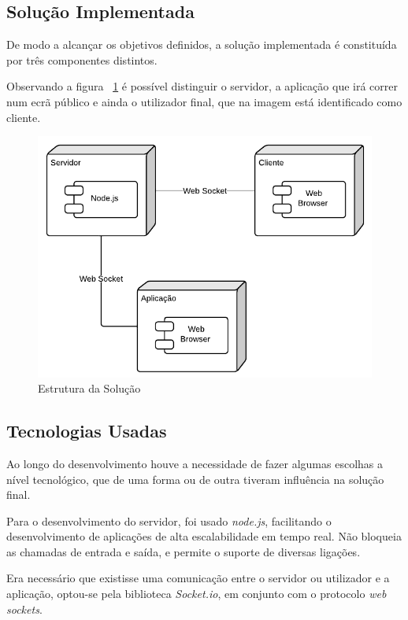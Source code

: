 \documentclass[9pt,a4paper]{extarticle}
\begin{document}
\begin{multicols}{2}
\section{Solução Implementada}\label{sec:work}

De modo a alcançar os objetivos definidos, a solução implementada é constituída por três componentes distintos. 

Observando a figura ~\ref{fig:componentes} é possível distinguir o servidor, a aplicação que irá correr num ecrã público e ainda o utilizador final, que na imagem está identificado como cliente.

\begin{figure}[H]
\centerline{\includegraphics[scale=.5]{Components}}
\caption{Estrutura da Solução}  
\label{fig:componentes}
\end{figure}

\subsection{Tecnologias Usadas}\label{sec:lingua}

Ao longo do desenvolvimento houve a necessidade de fazer algumas escolhas a nível tecnológico, que de uma forma ou de outra tiveram influência na solução final.

Para o desenvolvimento do servidor, foi usado \textit{node.js}, facilitando o desenvolvimento de aplicações de alta escalabilidade em tempo real. Não bloqueia as chamadas de entrada e saída, e permite o suporte de diversas ligações.

Era necessário que existisse uma comunicação entre o servidor ou utilizador e a aplicação, optou-se pela biblioteca \textit{Socket.io}, em conjunto com o protocolo \textit{web sockets}. 


\end{multicols}
\end{document}
